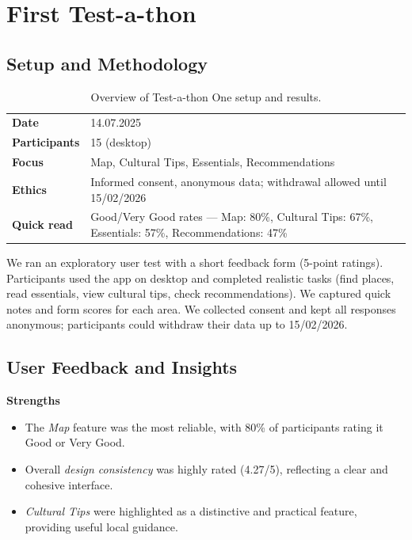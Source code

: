 \section{First Test-a-thon}
\label{sec:testathon-one}

\subsection{Setup and Methodology}
\begin{table}[h!]
\centering
\small
\begin{tabularx}{0.9\textwidth}{l X}
\hline
\textbf{Date} & 14.07.2025 \\
\textbf{Participants} & 15 (desktop) \\
\textbf{Focus} & Map, Cultural Tips, Essentials, Recommendations \\
\textbf{Ethics} & Informed consent, anonymous data; withdrawal allowed until 15/02/2026 \\
\textbf{Quick read} & Good/Very Good rates — Map: 80\%, Cultural Tips: 67\%, Essentials: 57\%, Recommendations: 47\% \\
\hline
\end{tabularx}
\caption{Overview of Test-a-thon One setup and results.}
\label{tab:testathon1-overview}
\end{table}




\noindent We ran an exploratory user test with a short feedback form (5-point ratings).
Participants used the app on desktop and completed realistic tasks (find places, read essentials, view cultural tips, check recommendations). We captured quick notes and form scores for each area. 
We collected consent and kept all responses anonymous; participants could withdraw their data up to 15/02/2026. 

\subsection{User Feedback and Insights}

\textbf{Strengths}
\begin{itemize} \itemsep0pt \parskip0pt
    \item The \emph{Map} feature was the most reliable, with 80\% of participants rating it Good or Very Good. 
    \item Overall \emph{design consistency} was highly rated (4.27/5), reflecting a clear and cohesive interface. 
    \item \emph{Cultural Tips} were highlighted as a distinctive and practical feature, providing useful local guidance. 
\end{itemize}

